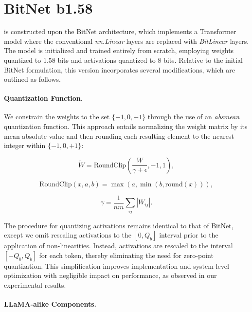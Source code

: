 \section{BitNet b1.58}

 is constructed upon the BitNet architecture, which implements a Transformer model where the conventional \emph{nn.Linear} layers are replaced with \emph{BitLinear} layers. The model is initialized and trained entirely from scratch, employing weights quantized to 1.58 bits and activations quantized to 8 bits. Relative to the initial BitNet formulation, this version incorporates several modifications, which are outlined as follows.

\paragraph{Quantization Function.} We constrain the weights to the set $\{-1, 0, +1\}$ through the use of an \emph{absmean} quantization function. This approach entails normalizing the weight matrix by its mean absolute value and then rounding each resulting element to the nearest integer within $\{-1, 0, +1\}$:

\begin{equation}
    \widetilde{W} = \mathrm{RoundClip}(\frac{W}{\gamma + \epsilon}, -1, 1),
\end{equation}

\begin{equation}
    \mathrm{RoundClip}(x, a, b) = \max(a, \min(b, \mathrm{round}(x))),
\end{equation}

\begin{equation}
    \gamma = \frac{1}{nm}\sum_{ij} |W_{ij}|.
\end{equation}

The procedure for quantizing activations remains identical to that of BitNet, except we omit rescaling activations to the $[0, Q_b]$ interval prior to the application of non-linearities. Instead, activations are rescaled to the interval $[-Q_b, Q_b]$ for each token, thereby eliminating the need for zero-point quantization. This simplification improves implementation and system-level optimization with negligible impact on performance, as observed in our experimental results.

\paragraph{LLaMA-alike Components.}

